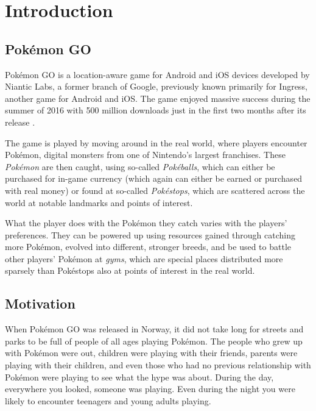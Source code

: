 \chapter{Introduction}
\label{chapter:introduction}

\section{Pokémon GO}
\label{sec:about-pokemon-go}

Pokémon GO is a location-aware game for Android and iOS devices developed by Niantic Labs, a former branch of Google, previously known primarily for Ingress, another game for Android and iOS. The game enjoyed massive success during the summer of 2016 with 500 million downloads just in the first two months after its release .

The game is played by moving around in the real world, where players encounter Pokémon, digital monsters from one of Nintendo's largest franchises. These \emph{Pokémon} are then caught, using so-called \emph{Pokéballs}, which can either be purchased for in-game currency (which again can either be earned or purchased with real money) or found at so-called \emph{Pokéstops}, which are scattered across the world at notable landmarks and points of interest.

What the player does with the Pokémon they catch varies with the players' preferences. They can be powered up using resources gained through catching more Pokémon, evolved into different, stronger breeds, and be used to battle other players' Pokémon at \emph{gyms}, which are special places distributed more sparsely than Pokéstops also at points of interest in the real world.

\section{Motivation}

When Pokémon GO was released in Norway, it did not take long for streets and parks to be full of people of all ages playing Pokémon. The people who grew up with Pokémon were out, children were playing with their friends, parents were playing with their children, and even those who had no previous relationship with Pokémon were playing to see what the hype was about. During the day, everywhere you looked, someone was playing. Even during the night you were likely to encounter teenagers and young adults playing.

